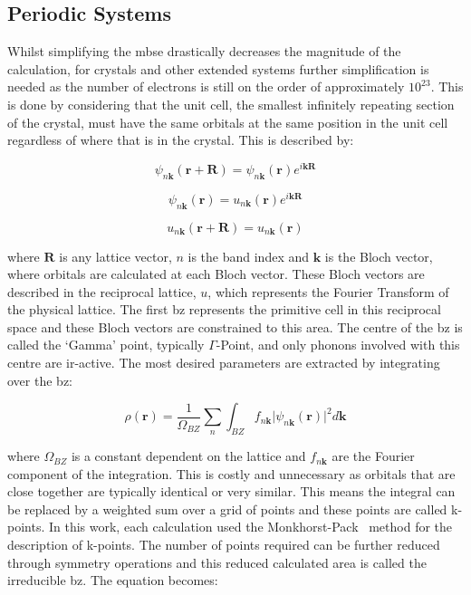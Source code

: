 \subsection{Periodic Systems}
\label{subsec:bloch}
Whilst simplifying the \acrshort{mbse} drastically decreases the magnitude of the calculation, for crystals and other extended systems further simplification is needed as the number of electrons is still on the order of approximately \(10^{23}\). This is done by considering that the unit cell, the smallest infinitely repeating section of the crystal, must have the same orbitals at the same position in the unit cell regardless of where that is in the crystal. This is described by:

\begin{equation}
\psi_{n\mathbf{k}}(\mathbf{r} + \mathbf{R}) = \psi_{n\mathbf{k}}(\mathbf{r})e^{i\mathbf{k}\mathbf{R}}
\end{equation}

\begin{equation}
\psi_{n\mathbf{k}}(\mathbf{r}) = u_{n\mathbf{k}}(\mathbf{r})e^{i\mathbf{k}\mathbf{R}}
\end{equation}

\begin{equation}
u_{n\mathbf{k}}(\mathbf{r} + \mathbf{R}) = u_{n\mathbf{k}}(\mathbf{r})
\end{equation}

where \(\mathbf{R}\) is any lattice vector, \(n\) is the band index and \(\mathbf{k}\) is the Bloch vector, where orbitals are calculated at each Bloch vector. These Bloch vectors are described in the reciprocal lattice, \(u\), which represents the Fourier Transform of the physical lattice. The first \acrfull{bz} represents the primitive cell in this reciprocal space and these Bloch vectors are constrained to this area. The centre of the \acrshort{bz} is called the `Gamma' point, typically \(\Gamma\)-Point, and only phonons involved with this centre are \acrshort{ir}\nobreakdash-active. The most desired parameters are extracted by integrating over the \acrshort{bz}:

\begin{equation}
\rho(\mathbf{r}) = \frac{1}{\Omega_{BZ}} \sum_n \int_{BZ} f_{n\mathbf{k}} \lvert \psi_{n\mathbf{k}}(\mathbf{r}) \rvert^2 d\mathbf{k}
\end{equation}

where \(\Omega_{BZ}\) is a constant dependent on the lattice and \(f_{n\mathbf{k}}\) are the Fourier component of the integration. This is costly and unnecessary as orbitals that are close together are typically identical or very similar. This means the integral can be replaced by a weighted sum over a grid of points and these points are called k\nobreakdash-points. In this work, each calculation used the Monkhorst-Pack~\cite{Monkhorst1976} method for the description of k-points. The number of points required can be further reduced through symmetry operations and this reduced calculated area is called the irreducible \acrshort{bz}. The equation becomes: 

